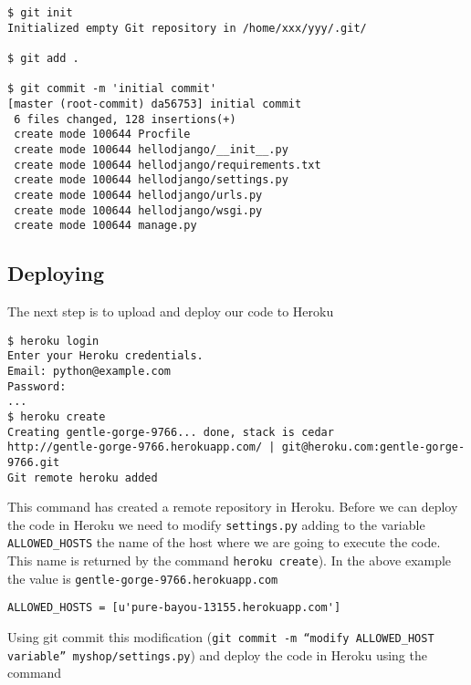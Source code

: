 \documentclass[12pt]{article} %
\begin{document}
\begin{verbatim}
$ git init 
Initialized empty Git repository in /home/xxx/yyy/.git/ 
 
$ git add . 
 
$ git commit -m 'initial commit'
[master (root-commit) da56753] initial commit 
 6 files changed, 128 insertions(+) 
 create mode 100644 Procfile 
 create mode 100644 hellodjango/__init__.py 
 create mode 100644 hellodjango/requirements.txt 
 create mode 100644 hellodjango/settings.py 
 create mode 100644 hellodjango/urls.py 
 create mode 100644 hellodjango/wsgi.py 
 create mode 100644 manage.py 
\end{verbatim}

\subsection{Deploying}

The next step is to upload and deploy our code to Heroku

 \begin{verbatim}
$ heroku login
Enter your Heroku credentials.
Email: python@example.com
Password:
...
$ heroku create 
Creating gentle-gorge-9766... done, stack is cedar 
http://gentle-gorge-9766.herokuapp.com/ | git@heroku.com:gentle-gorge-9766.git 
Git remote heroku added
 \end{verbatim}

 
 This command has created a remote repository in Heroku. Before we can deploy the code in Heroku  we need to modify  \texttt{settings.py} adding to the variable \texttt{ALLOWED\_HOSTS} the name of the host where we are going to execute the code. This name is returned by the command \texttt{heroku create}). In the above example the value is  \texttt{gentle-gorge-9766.herokuapp.com}

\begin{verbatim}
ALLOWED_HOSTS = [u'pure-bayou-13155.herokuapp.com']
\end{verbatim}
Using git commit this modification  (\texttt{git commit -m ``modify ALLOWED\_HOST variable'' myshop/settings.py}) and deploy the code in Heroku using the command
\end{document}
